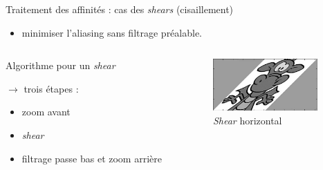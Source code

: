 \documentclass[c,12pt]{beamer}
\newcommand{\ra}[0]{\rightarrow}
\begin{document}
\begin{frame}{Traitement des affinités : cas des \emph{shears} (cisaillement)}



\begin{itemize}
\item minimiser l'aliasing sans filtrage préalable.
\end{itemize}

\begin{columns}
\begin{column}{5cm}

\begin{block}{Algorithme pour un \emph{shear}}

$\ra$ trois étapes :

\begin{itemize}
\item zoom avant
\item \emph{shear}
\item filtrage passe bas et zoom arrière
\end{itemize}

\end{block}
  
 \end{column}

\begin{column}{5cm}

\begin{figure}
\centering
\includegraphics[width=4cm]{dragonshear.jpg}
\caption{\emph{Shear} horizontal}
\end{figure}

\end{column}
\end{columns}
\end{frame}
\end{document}
